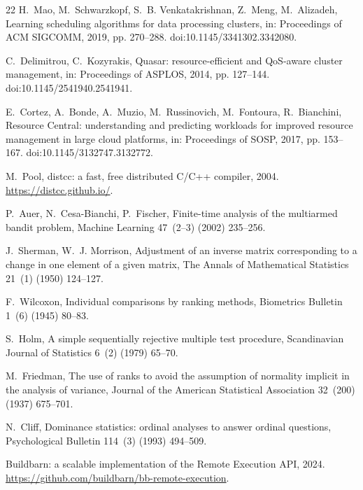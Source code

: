 \documentclass[final,5p,times,twocolumn]{elsarticle}
\begin{document}
\begin{thebibliography}{22}
 H.~Mao, M.~Schwarzkopf, S.~B. Venkatakrishnan, Z.~Meng, M.~Alizadeh, Learning scheduling algorithms for data processing clusters, in: Proceedings of ACM SIGCOMM, 2019, pp. 270--288. doi:10.1145/3341302.3342080.

 C.~Delimitrou, C.~Kozyrakis, Quasar: resource-efficient and QoS-aware cluster management, in: Proceedings of ASPLOS, 2014, pp. 127--144. doi:10.1145/2541940.2541941.

 E.~Cortez, A.~Bonde, A.~Muzio, M.~Russinovich, M.~Fontoura, R.~Bianchini, Resource Central: understanding and predicting workloads for improved resource management in large cloud platforms, in: Proceedings of SOSP, 2017, pp. 153--167. doi:10.1145/3132747.3132772.

 M.~Pool, distcc: a fast, free distributed C/C++ compiler, 2004. \url{https://distcc.github.io/}.

 P.~Auer, N.~Cesa-Bianchi, P.~Fischer, Finite-time analysis of the multiarmed bandit problem, Machine Learning 47~(2--3) (2002) 235--256.

 J.~Sherman, W.~J. Morrison, Adjustment of an inverse matrix corresponding to a change in one element of a given matrix, The Annals of Mathematical Statistics 21~(1) (1950) 124--127.

 F.~Wilcoxon, Individual comparisons by ranking methods, Biometrics Bulletin 1~(6) (1945) 80--83.

 S.~Holm, A simple sequentially rejective multiple test procedure, Scandinavian Journal of Statistics 6~(2) (1979) 65--70.

 M.~Friedman, The use of ranks to avoid the assumption of normality implicit in the analysis of variance, Journal of the American Statistical Association 32~(200) (1937) 675--701.

 N.~Cliff, Dominance statistics: ordinal analyses to answer ordinal questions, Psychological Bulletin 114~(3) (1993) 494--509.

 Buildbarn: a scalable implementation of the Remote Execution API, 2024. \url{https://github.com/buildbarn/bb-remote-execution}.

\end{thebibliography}
\end{document}
